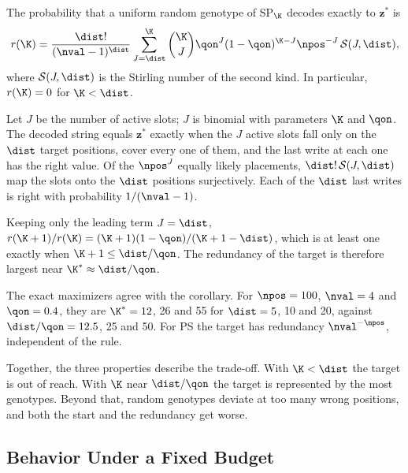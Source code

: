 \begin{proposition}
\label{prop:red}
The probability that a uniform random genotype of SP$_\K$ decodes exactly to $\mathbf{z}^\ast$ is
\begin{equation}
  r(\K) = \frac{\dist!}{(\nval-1)^{\dist}} \sum_{J=\dist}^{\K} \binom{\K}{J} \qon^J (1-\qon)^{\K-J} \npos^{-J}\, \mathcal{S}(J, \dist),
\end{equation}
where $\mathcal{S}(J,\dist)$ is the Stirling number of the second kind. In particular, $r(\K) = 0$ for $\K < \dist$.
\end{proposition}

\begin{IEEEproof}
Let $J$ be the number of active slots; $J$ is binomial with parameters $\K$ and $\qon$.
The decoded string equals $\mathbf{z}^\ast$ exactly when the $J$ active slots fall only on the $\dist$ target positions,
cover every one of them, and the last write at each one has the right value.
Of the $\npos^J$ equally likely placements, $\dist!\,\mathcal{S}(J,\dist)$ map the slots onto the $\dist$ positions surjectively.
Each of the $\dist$ last writes is right with probability $1/(\nval-1)$.
\end{IEEEproof}

\begin{corollary}
\label{cor:kstar}
Keeping only the leading term $J = \dist$, $r(\K+1)/r(\K) = (\K+1)(1-\qon)/(\K+1-\dist)$, which is at least one exactly when $\K + 1 \le \dist/\qon$.
The redundancy of the target is therefore largest near $\K^\ast \approx \dist/\qon$.
\end{corollary}

The exact maximizers agree with the corollary.
For $\npos = 100$, $\nval = 4$ and $\qon = 0.4$, they are $\K^\ast = 12$, 26 and 55 for $\dist = 5$, 10 and 20, against $\dist/\qon = 12.5$, 25 and 50.
For PS the target has redundancy $\nval^{-\npos}$, independent of the rule.

Together, the three properties describe the trade-off.
With $\K < \dist$ the target is out of reach.
With $\K$ near $\dist/\qon$ the target is represented by the most genotypes.
Beyond that, random genotypes deviate at too many wrong positions, and both the start and the redundancy get worse.

\subsection{Behavior Under a Fixed Budget}
\label{sec:theory:budget}

